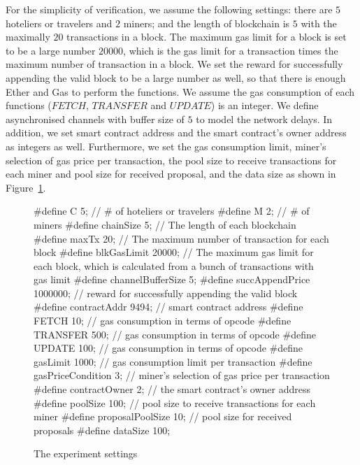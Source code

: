 \documentclass{KERauth}
\begin{document}
For the simplicity of verification, we assume the following settings: there are $5$ hoteliers or travelers and $2$ miners; and the length of blockchain is $5$ with the maximally $20$ transactions in a block. The maximum gas limit for a block is set to be a large number $20000$, which is the gas limit for a transaction times the maximum number of transaction in a block. We set the reward for successfully appending the valid block to be a large number as well, so that there is enough Ether and Gas to perform the functions. We assume the gas consumption of each functions ($FETCH$, $TRANSFER$ and $UPDATE$) is an integer. We define asynchronised channels with buffer size of $5$ to model the network delays. In addition, we set smart contract address and the smart contract's owner address as integers as well. Furthermore, we set the gas consumption limit, miner's selection of gas price per transaction, the pool size to receive transactions for each miner and pool size for received proposal, and the data size as shown in Figure~\ref{fig:setting}.

\begin{figure}[h]
\begin{center}
\begin{boxedverbatim}
#define C 5; // # of hoteliers or travelers
#define M 2; // # of miners
#define chainSize 5; // The length of each blockchain
#define maxTx 20; // The maximum number of transaction for each block
#define blkGasLimit 20000; // The maximum gas limit for each block, which is 
calculated from a bunch of transactions with gas limit
#define channelBufferSize 5;
#define succAppendPrice 1000000; // reward for successfully appending the 
valid block
#define contractAddr 9494; // smart contract address
#define FETCH 10; // gas consumption in terms of opcode
#define TRANSFER 500; // gas consumption in terms of opcode
#define UPDATE 100; // gas consumption in terms of opcode
#define gasLimit 1000; // gas consumption limit per transaction
#define gasPriceCondition 3; // miner's selection of gas price per transaction
#define contractOwner 2; // the smart contract's owner address
#define poolSize 100; // pool size to receive transactions for each miner
#define proposalPoolSize 10; // pool size for received proposals
#define dataSize 100;
\end{boxedverbatim}
\end{center}
\caption{The experiment settings}\label{fig:setting}
\end{figure}
\end{document}
